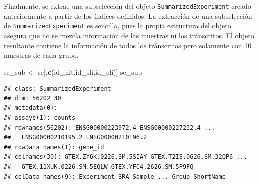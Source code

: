 \documentclass[
]{article}
\newenvironment{Shaded}{\begin{snugshade}}{\end{snugshade}}
\newcommand{\CharTok}[1]{\textcolor[rgb]{0.31,0.60,0.02}{#1}}
\newcommand{\DataTypeTok}[1]{\textcolor[rgb]{0.13,0.29,0.53}{#1}}
\newcommand{\DecValTok}[1]{\textcolor[rgb]{0.00,0.00,0.81}{#1}}
\newcommand{\KeywordTok}[1]{\textcolor[rgb]{0.13,0.29,0.53}{\textbf{#1}}}
\newcommand{\NormalTok}[1]{#1}
\newcommand{\OperatorTok}[1]{\textcolor[rgb]{0.81,0.36,0.00}{\textbf{#1}}}
\newcommand{\StringTok}[1]{\textcolor[rgb]{0.31,0.60,0.02}{#1}}
\begin{document}
\begin{Shaded}
\end{Shaded}

Finalmente, se extrae una subselección del objeto
\texttt{SummarizedExperiment} creado anteriormente a partir de los
índices definidos. La extracción de una subselección de
\texttt{SummarizedExperiment} es sencilla, pues la propia estructura del
objeto asegura que no se mezcla información de las muestras ni los
tránscritos. El objeto resultante contiene la información de todos los
tránscritos pero solamente con 10 muestras de cada grupo.

\begin{Shaded}
\begin{Highlighting}[]
\NormalTok{se_sub <-}\StringTok{ }\NormalTok{se[,}\KeywordTok{c}\NormalTok{(id_nit,id_sfi,id_eli)]}
\NormalTok{se_sub}
\end{Highlighting}
\end{Shaded}

\begin{verbatim}
## class: SummarizedExperiment 
## dim: 56202 30 
## metadata(0):
## assays(1): counts
## rownames(56202): ENSG00000223972.4 ENSG00000227232.4 ...
##   ENSG00000210195.2 ENSG00000210196.2
## rowData names(1): gene_id
## colnames(30): GTEX.ZY6K.0226.SM.5SIAY GTEX.T2IS.0626.SM.32QP6 ...
##   GTEX.11XUK.0226.SM.5EQLW GTEX.YFC4.2626.SM.5P9FQ
## colData names(9): Experiment SRA_Sample ... Group ShortName
\end{verbatim}
\end{document}
